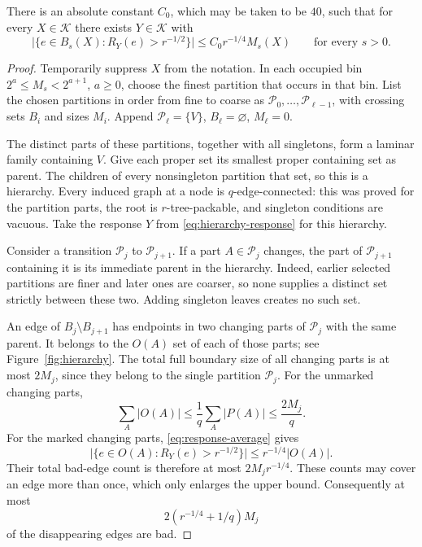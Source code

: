 \begin{lemma}\label{lem:response}
There is an absolute constant \(C_0\), which may be taken to be \(40\),
such that for every \(X\in\mathcal K\) there exists \(Y\in\mathcal K\)
with
\begin{equation}\label{eq:simultaneous-response}
 \bigl|\{e\in B_s(X):R_Y(e)>r^{-1/2}\}\bigr|
 \le C_0r^{-1/4}M_s(X)
 \qquad\text{for every }s>0.
\end{equation}
\end{lemma}
\begin{proof}
Temporarily suppress \(X\) from the notation.
In each occupied bin \(2^a\le M_s<2^{a+1}\), \(a\ge0\),
choose the finest partition that occurs in that bin.
List the chosen partitions in order from fine to coarse as
\(\mathcal P_0,\ldots,\mathcal P_{\ell-1}\), with crossing sets
\(B_i\) and sizes \(M_i\). Append
\(\mathcal P_\ell=\{V\}\), \(B_\ell=\varnothing\), \(M_\ell=0\).

The distinct parts of these partitions, together with all
singletons, form a laminar family containing \(V\).
Give each proper set its smallest proper containing set as parent.
The children of every nonsingleton partition that set, so this is
a hierarchy. Every induced graph at a node is \(q\)-edge-connected:
this was proved for the partition parts, the root is
\(r\)-tree-packable, and singleton conditions are vacuous.
Take the response \(Y\) from \eqref{eq:hierarchy-response} for this
hierarchy.

Consider a transition \(\mathcal P_j\) to \(\mathcal P_{j+1}\).
If a part \(A\in\mathcal P_j\) changes, the part of
\(\mathcal P_{j+1}\) containing it is its immediate parent in the
hierarchy. Indeed, earlier selected partitions are finer and later
ones are coarser, so none supplies a distinct set strictly between
these two. Adding singleton leaves creates no such set.

An edge of \(B_j\setminus B_{j+1}\) has endpoints in two changing
parts of \(\mathcal P_j\) with the same parent. It belongs to the
\(O(A)\) set of each of those parts; see Figure~\ref{fig:hierarchy}.
The total full boundary size of all changing parts is at most
\(2M_j\), since they belong to the single partition \(\mathcal P_j\).
For the unmarked changing parts,
\[
 \sum_A |O(A)|\le \frac1q\sum_A|P(A)|\le\frac{2M_j}{q}.
\]
For the marked changing parts, \eqref{eq:response-average} gives
\[
 \bigl|\{e\in O(A):R_Y(e)>r^{-1/2}\}\bigr|
 \le r^{-1/4}|O(A)|.
\]
Their total bad-edge count is therefore at most \(2M_jr^{-1/4}\).
These counts may cover an edge more than once, which only enlarges
the upper bound. Consequently at most
\[
 2(r^{-1/4}+1/q)M_j
\]
of the disappearing edges are bad.


\end{proof}
